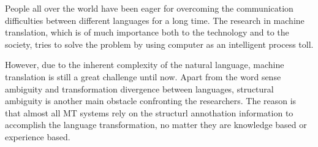 People all over the world have been eager for overcoming the communication difficulties between different languages for a long time. The research in machine translation, which is of much importance both to the technology and to the society, tries to solve the problem by using computer as an intelligent process toll.

However, due to the inherent complexity of the natural language, machine translation is still a great challenge until now. Apart from the word sense ambiguity and transformation divergence between languages, structural ambiguity is another main obstacle confronting the researchers. The reason is that almost all MT systems rely on the structurl annothation information to accomplish the language transformation, no matter they are knowledge based or experience based.

